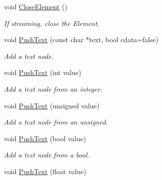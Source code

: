 \begin{DoxyCompactItemize}
void \hyperlink{classtinyxml2_1_1XMLPrinter_aed6cce4bd414a78b3e2a824803c3ec42}{Close\+Element} ()
\begin{DoxyCompactList}\small\item\em If streaming, close the Element. \end{DoxyCompactList}\item 
\mbox{\label{classtinyxml2_1_1XMLPrinter_a1cc16a9362df4332012cb13cff6441b3}} 
void \hyperlink{classtinyxml2_1_1XMLPrinter_a1cc16a9362df4332012cb13cff6441b3}{Push\+Text} (const char $\ast$text, bool cdata=false)
\begin{DoxyCompactList}\small\item\em Add a text node. \end{DoxyCompactList}\item 
\mbox{\label{classtinyxml2_1_1XMLPrinter_a3e0d4d78de25d4cf081009e1431cea7e}} 
void \hyperlink{classtinyxml2_1_1XMLPrinter_a3e0d4d78de25d4cf081009e1431cea7e}{Push\+Text} (int value)
\begin{DoxyCompactList}\small\item\em Add a text node from an integer. \end{DoxyCompactList}\item 
\mbox{\label{classtinyxml2_1_1XMLPrinter_a661fb50e7e0a4918d2d259cb0fae647e}} 
void \hyperlink{classtinyxml2_1_1XMLPrinter_a661fb50e7e0a4918d2d259cb0fae647e}{Push\+Text} (unsigned value)
\begin{DoxyCompactList}\small\item\em Add a text node from an unsigned. \end{DoxyCompactList}\item 
\mbox{\label{classtinyxml2_1_1XMLPrinter_a4390e5fa1ed05189a8686647345ab29f}} 
void \hyperlink{classtinyxml2_1_1XMLPrinter_a4390e5fa1ed05189a8686647345ab29f}{Push\+Text} (bool value)
\begin{DoxyCompactList}\small\item\em Add a text node from a bool. \end{DoxyCompactList}\item 
\mbox{\label{classtinyxml2_1_1XMLPrinter_a1dbb1390e829d0673af66b9cd1928bd7}} 
void \hyperlink{classtinyxml2_1_1XMLPrinter_a1dbb1390e829d0673af66b9cd1928bd7}{Push\+Text} (float value)

\end{DoxyCompactItemize}
